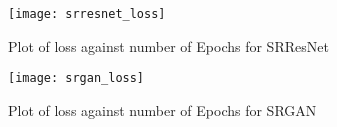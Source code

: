 \begin{figure}[h]
\centering
\texttt{[image: srresnet\_loss]}
\caption{Plot of loss against number of Epochs for SRResNet}
\label{fig:srresnetloss}
\end{figure}

\begin{figure}[h]
\centering
\texttt{[image: srgan\_loss]}
\caption{Plot of loss against number of Epochs for SRGAN}
\label{fig:srganloss}
\end{figure}